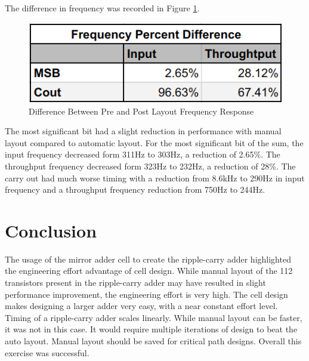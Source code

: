 \documentclass[11pt]{article}
\begin{document}
	The difference in frequency was recorded in Figure \ref{fig:percent-diff}.
	
	\begin{figure}[H]
		\centering
		\includegraphics[width=0.4\linewidth]{"Pictures/Percent Diff"}
		\caption{Difference Between Pre and Post Layout Frequency Response}
		\label{fig:percent-diff}
	\end{figure}

	The most significant bit had a slight reduction in performance with manual layout compared to automatic layout. For the most significant bit of the sum, the input frequency decreased form 311Hz to 303Hz, a reduction of 2.65\%. The throughput frequency decreased form 323Hz to 232Hz, a reduction of 28\%. The carry out had much worse timing with a reduction from 8.6kHz to 290Hz in input frequency and a throughput frequency reduction from 750Hz to 244Hz. 
	
	

\section{Conclusion}

	The usage of the mirror adder cell to create the ripple-carry adder highlighted the engineering effort advantage of cell design. While manual layout of the 112 transistors present in the ripple-carry adder may have resulted in slight performance improvement, the engineering effort is very high. The cell design makes designing a larger adder very easy, with a near constant effort level. Timing of a ripple-carry adder scales linearly. While manual layout can be faster, it was not in this case. It would require multiple iterations of design to beat the auto layout. Manual layout should be saved for critical path designs. Overall this exercise was successful. 
\end{document}
